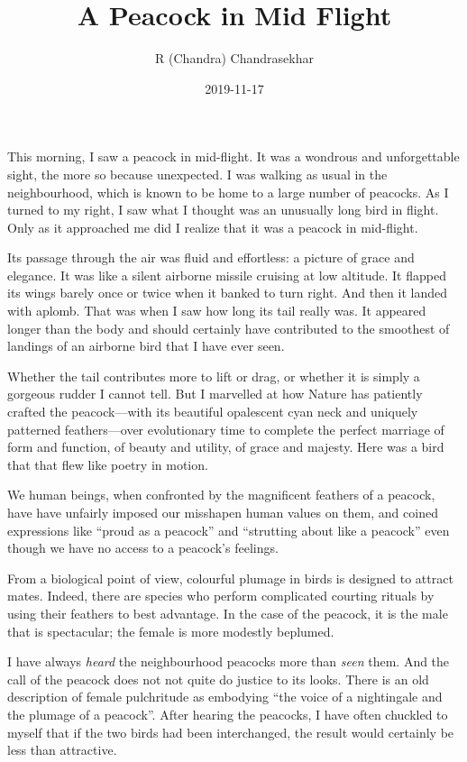 \documentclass[
  12pt,
  british,
  a4paper,
  rgb,
  dvipsnames,
  svgnames,
  hyphens]{article}
\title{A Peacock in Mid Flight}
\author{R (Chandra) Chandrasekhar}
\date{2019-11-17}
\begin{document}
\maketitle

\setlength{\parindent}{0pt} %
\thispagestyle{empty}


This morning, I saw a peacock in mid-flight. It was a wondrous and
unforgettable sight, the more so because unexpected. I was walking as
usual in the neighbourhood, which is known to be home to a large number
of peacocks. As I turned to my right, I saw what I thought was an
unusually long bird in flight. Only as it approached me did I realize
that it was a peacock in mid-flight.

Its passage through the air was fluid and effortless: a picture of grace
and elegance. It was like a silent airborne missile cruising at low
altitude. It flapped its wings barely once or twice when it banked to
turn right. And then it landed with aplomb. That was when I saw how long
its tail really was. It appeared longer than the body and should
certainly have contributed to the smoothest of landings of an airborne
bird that I have ever seen.

Whether the tail contributes more to lift or drag, or whether it is
simply a gorgeous rudder I cannot tell. But I marvelled at how Nature
has patiently crafted the peacock---with its beautiful opalescent cyan
neck and uniquely patterned feathers---over evolutionary time to
complete the perfect marriage of form and function, of beauty and
utility, of grace and majesty. Here was a bird that that flew like
poetry in motion.

We human beings, when confronted by the magnificent feathers of a
peacock, have have unfairly imposed our misshapen human values on them,
and coined expressions like ``proud as a peacock'' and ``strutting about
like a peacock'' even though we have no access to a peacock's feelings.

From a biological point of view, colourful plumage in birds is designed
to attract mates. Indeed, there are species who perform complicated
courting rituals by using their feathers to best advantage. In the case
of the peacock, it is the male that is spectacular; the female is more
modestly beplumed.

I have always \emph{heard} the neighbourhood peacocks more than
\emph{seen} them. And the call of the peacock does not not quite do
justice to its looks. There is an old description of female pulchritude
as embodying ``the voice of a nightingale and the plumage of a
peacock''. After hearing the peacocks, I have often chuckled to myself
that if the two birds had been interchanged, the result would certainly
be less than attractive.
\end{document}
